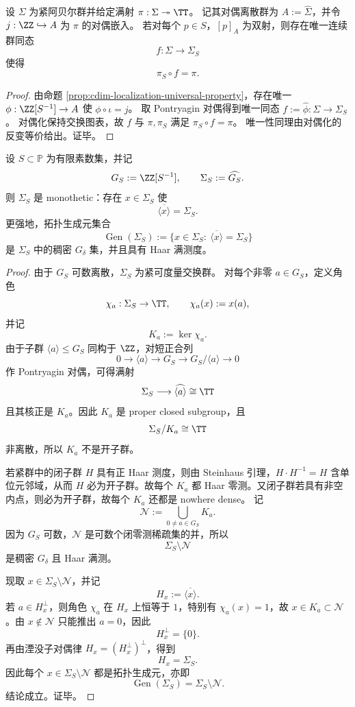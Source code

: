 \begin{theorem}\label{thm:cdim-s-solenoid-terminal-object}
设 \(\Sigma\) 为紧阿贝尔群并给定满射 \(\pi:\Sigma\twoheadrightarrow \TT\)。
记其对偶离散群为 \(A:=\widehat{\Sigma}\)，并令 \(j:\ZZ\hookrightarrow A\) 为 \(\pi\) 的对偶嵌入。
若对每个 \(p\in S\)，\([p]_A\) 为双射，则存在唯一连续群同态
\[
f:\Sigma\longrightarrow \Sigma_S
\]
使得
\[
\pi_S\circ f=\pi.
\]
\end{theorem}
\begin{proof}
由命题 \ref{prop:cdim-localization-universal-property}，存在唯一 \(\phi:\ZZ[S^{-1}]\to A\) 使 \(\phi\circ\iota=j\)。
取 Pontryagin 对偶得到唯一同态 \(f:=\widehat{\phi}:\Sigma\to\Sigma_S\)。
对偶化保持交换图表，故 \(f\) 与 \(\pi,\pi_S\) 满足 \(\pi_S\circ f=\pi\)。
唯一性同理由对偶化的反变等价给出。证毕。
\end{proof}

\begin{theorem}\label{thm:cdim-s-solenoid-generic-monothetic}
设 \(S\subset\mathbb P\) 为有限素数集，并记
\[
G_S:=\ZZ[S^{-1}],
\qquad
\Sigma_S:=\widehat{G_S}.
\]
则 \(\Sigma_S\) 是 monothetic：存在 \(x\in \Sigma_S\) 使
\[
\overline{\langle x\rangle}=\Sigma_S.
\]
更强地，拓扑生成元集合
\[
\operatorname{Gen}(\Sigma_S)
:=
\{x\in \Sigma_S:\ \overline{\langle x\rangle}=\Sigma_S\}
\]
是 \(\Sigma_S\) 中的稠密 \(G_\delta\) 集，并且具有 Haar 满测度。
\end{theorem}
\begin{proof}
由于 \(G_S\) 可数离散，\(\Sigma_S\) 为紧可度量交换群。
对每个非零 \(a\in G_S\)，定义角色
\[
\chi_a:\Sigma_S\to \TT,
\qquad
\chi_a(x):=x(a),
\]
并记
\[
K_a:=\ker \chi_a.
\]
由于子群 \(\langle a\rangle\le G_S\) 同构于 \(\ZZ\)，对短正合列
\[
0\longrightarrow \langle a\rangle
\longrightarrow G_S
\longrightarrow G_S/\langle a\rangle
\longrightarrow 0
\]
作 Pontryagin 对偶，可得满射
\[
\Sigma_S\longrightarrow \widehat{\langle a\rangle}\cong \TT
\]
且其核正是 \(K_a\)。因此 \(K_a\) 是 proper closed subgroup，且
\[
\Sigma_S/K_a\cong \TT
\]
非离散，所以 \(K_a\) 不是开子群。

若紧群中的闭子群 \(H\) 具有正 Haar 测度，则由 Steinhaus 引理，\(H\cdot H^{-1}=H\) 含单位元邻域，从而 \(H\) 必为开子群。故每个 \(K_a\) 都 Haar 零测。又闭子群若具有非空内点，则必为开子群，故每个 \(K_a\) 还都是 nowhere dense。
记
\[
\mathcal N:=\bigcup_{0\neq a\in G_S}K_a.
\]
因为 \(G_S\) 可数，\(\mathcal N\) 是可数个闭零测稀疏集的并，所以
\[
\Sigma_S\setminus \mathcal N
\]
是稠密 \(G_\delta\) 且 Haar 满测。

现取 \(x\in \Sigma_S\setminus \mathcal N\)，并记
\[
H_x:=\overline{\langle x\rangle}.
\]
若 \(a\in H_x^\perp\)，则角色 \(\chi_a\) 在 \(H_x\) 上恒等于 \(1\)，特别有 \(\chi_a(x)=1\)，故 \(x\in K_a\subset \mathcal N\)。由 \(x\notin \mathcal N\) 只能推出 \(a=0\)，因此
\[
H_x^\perp=\{0\}.
\]
再由湮没子对偶律 \(H_x=(H_x^\perp)^\perp\)，得到
\[
H_x=\Sigma_S.
\]
因此每个 \(x\in \Sigma_S\setminus \mathcal N\) 都是拓扑生成元，亦即
\[
\operatorname{Gen}(\Sigma_S)=\Sigma_S\setminus \mathcal N.
\]
结论成立。证毕。
\end{proof}


